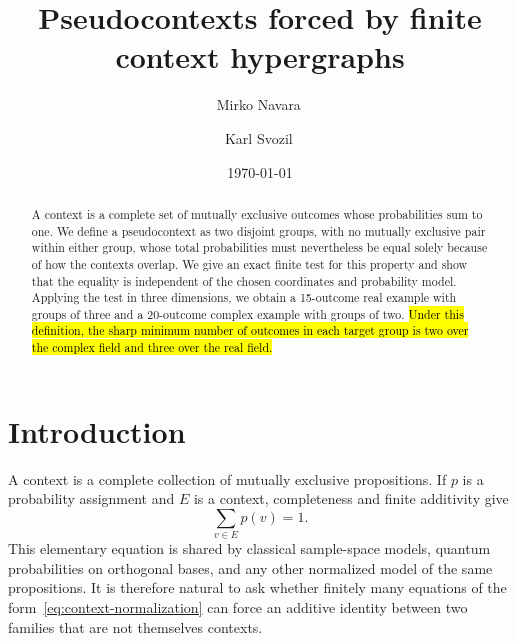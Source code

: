 \documentclass[
  twocolumn,
  aps,
  pra,
  floatfix,
  amsmath,amssymb,
  longbibliography
]{revtex4-2}
\theoremstyle{definition}
\theoremstyle{remark}
\newcommand{\corr}[1]{{\color{red}\hl{#1}}}
\begin{document}
\title{Pseudocontexts forced by finite context hypergraphs}

\author{Mirko Navara\,}

\author{Karl Svozil\,}

\date{\today}

\begin{abstract}
A context is a complete set of mutually exclusive outcomes whose probabilities sum to one. We define a pseudocontext as two disjoint groups, with no mutually exclusive pair within either group, whose total probabilities must nevertheless be equal solely because of how the contexts overlap. We give an exact finite test for this property and show that the equality is independent of the chosen coordinates and probability model. Applying the test in three dimensions, we obtain a 15-outcome real example with groups of three and a 20-outcome complex example with groups of two. \corr{Under this definition, the sharp minimum number of outcomes in each target group is two over the complex field and three over the real field.}
\end{abstract}

\maketitle

\section{Introduction}

A context is a complete collection of mutually exclusive propositions.  If
$p$ is a probability assignment and $E$ is a context, completeness and finite
additivity give
\begin{equation}
  \sum_{v\in E}p(v)=1.
  \label{eq:context-normalization}
\end{equation}
This elementary equation is shared by classical sample-space models,
quantum probabilities on orthogonal bases, and any other normalized model of
the same propositions.  It is therefore natural to ask whether finitely many
equations of the form~\eqref{eq:context-normalization} can force an additive
identity between two families that are not themselves contexts.
\end{document}
